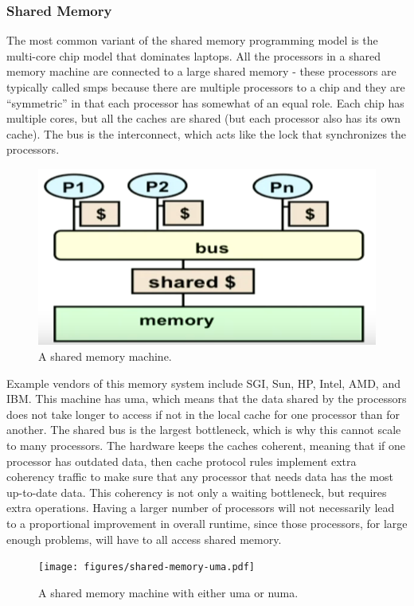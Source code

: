 \documentclass[10pt]{article}
\begin{document}
\begin{flushleft}
\subsubsection{Shared Memory}

The most common variant of the shared memory programming model is the multi-core chip model that dominates laptops. All the processors in a shared memory machine are connected to a large shared memory - these processors are typically called \gls{smp}s because there are multiple processors to a chip and they are ``symmetric'' in that each processor has somewhat of an equal role. Each chip has multiple cores, but all the caches are shared (but each processor also has its own cache). The bus is the interconnect, which acts like the lock that synchronizes the processors. 

\begin{figure}[H]
\centering
\includegraphics[width=0.5\linewidth]{figures/shared-memory.pdf}
\caption{A shared memory machine.}
\end{figure}

Example vendors of this memory system include SGI, Sun, HP, Intel, AMD, and IBM. This machine has \gls{uma}, which means that the data shared by the processors does not take longer to access if not in the local cache for one processor than for another. The shared bus is the largest bottleneck, which is why this cannot scale to many processors. The hardware keeps the caches coherent, meaning that if one processor has outdated data, then cache protocol rules implement extra coherency traffic to make sure that any processor that needs data has the most up-to-date data. This coherency is not only a waiting bottleneck, but requires extra operations. Having a larger number of processors will not necessarily lead to a proportional improvement in overall runtime, since those processors, for large enough problems, will have to all access shared memory.

\begin{figure}[H]
\centering
\texttt{[image: figures/shared-memory-uma.pdf]}
\caption{A shared memory machine with either \gls{uma} or \gls{numa}.}
\end{figure}


\end{flushleft}
\end{document}
